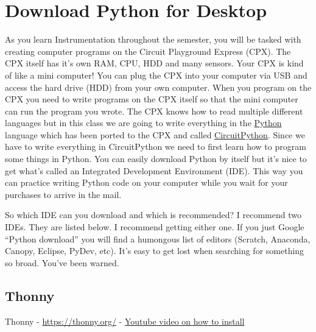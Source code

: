 
\section{Download Python for Desktop}

As you learn Instrumentation throughout the semester, you will be
tasked with creating computer programs on the Circuit Playground
Express (CPX). The CPX itself has it’s own RAM, CPU, HDD and many
sensors. Your CPX is kind of like a mini computer! You can plug the
CPX into your computer via USB and access the hard drive (HDD) from
your own computer. When you program on the CPX you need to write
programs on the CPX itself so that the mini computer can run the
program you wrote. The CPX knows how to read multiple different
languages but in this class we are going to write everything in the
\href{https://www.python.org/}{Python} language which has been ported
to the CPX and called
\href{https://circuitpython.org/}{CircuitPython}. Since we have to
write everything in CircuitPython we 
need to first learn how to program some things in Python. You can
easily download Python by itself but it’s nice to get what’s called an
Integrated Development Environment (IDE). This way you can practice
writing Python code on your computer while you wait for your purchases
to arrive in the mail. 

So which IDE can you download and which is recommended? I recommend
two IDEs. They are listed below. I recommend getting either one. If
you just Google “Python download” you will find a humongous list of
editors (Scratch, Anaconda, Canopy, Eclipse, PyDev, etc). It’s easy to
get lost when searching for something so broad. You’ve been warned.

\subsection{Thonny}

Thonny - \url{https://thonny.org/} -
\href{https://www.youtube.com/watch?v=qaxukpYRqfA&list=PL_D7_GvGz-v1RsDs_OdNW65qRjEjmpfQx&index=14}{Youtube
  video on how to install}

